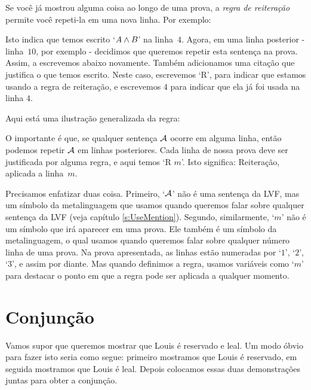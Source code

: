 Se voc\^e j\'a mostrou alguma coisa ao longo de uma prova, a  \emph{regra de  reitera\c c\~ao} permite voc\^e repeti-la em uma nova linha.  Por exemplo:
\begin{fitchproof}
	\have[$\vdots$]{}{\vdots}
	 
\end{fitchproof}
Isto indica que temos escrito `$A \wedge B$' na linha~$4$. Agora, em uma linha posterior - linha~$10$, por exemplo - decidimos que queremos repetir esta senten\c ca na prova. Assim, a escrevemos abaixo novamente.  Tamb\'em adicionamos uma cita\c c\~ao que justifica o que temos escrito. Neste caso, escrevemos  `R',  para indicar que estamos usando a regra de reitera\c c\~ao,  e escrevemos  $4$ para indicar  que ela j\'a foi usada na linha $4$.

 Aqui est\'a uma ilustra\c c\~ao generalizada da regra:

\begin{fitchproof}
	 
\end{fitchproof}
O importante \'e que, se qualquer senten\c ca $\mathcal{A}$ ocorre em alguma linha, ent\~ao podemos repetir $\mathcal{A}$ em linhas posteriores. Cada linha de nossa prova deve  ser justificada por alguma regra, e aqui temos `R $m$'.   Isto significa:  Reitera\c c\~ao, aplicada a linha~$m$. 

 Precisamos enfatizar duas coisa.  Primeiro,   `$\mathcal{A}$'   n\~ao   \'e uma senten\c ca da LVF,   mas um s\'imbolo da metalinguagem que usamos quando queremos falar sobre qualquer senten\c ca da LVF
 (veja cap\'itulo \ref{s:UseMention}).   Segundo, similarmente,  `$m$'  n\~ao \'e um s\'imbolo que ir\'a aparecer em uma prova.  Ele tamb\'em \'e um s\'imbolo da metalinguagem, o qual usamos quando queremos falar sobre qualquer n\'umero linha  de uma prova. Na prova apresentada, as linhas  est\~ao numeradas por `$1$', `$2$', `$3$', e assim por diante.  Mas quando definimos a regra, usamos vari\'aveis como   `$m$' para destacar o ponto em que a regra pode ser aplicada a qualquer momento. 

\section{Conjun\c c\~ao}
  Vamos supor que queremos mostrar que Louis \'e reservado e leal. Um modo \'obvio para fazer isto seria como segue: primeiro mostramos que Louis \'e reservado, em seguida mostramos que Louis \'e leal. Depois colocamos essas duas demonstra\c c\~oes juntas para obter a conjun\c c\~ao.

